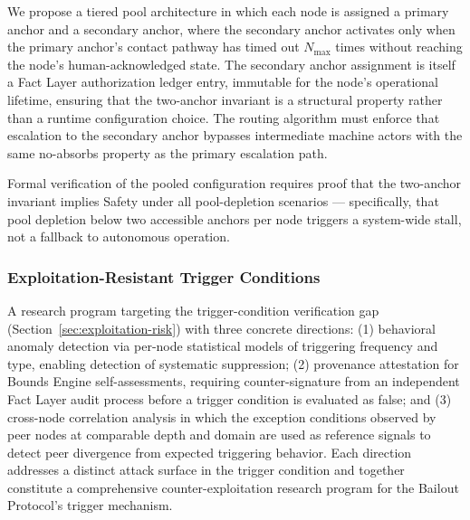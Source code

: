 We propose a tiered pool architecture in which each node is assigned a primary
anchor and a secondary anchor, where the secondary anchor activates only when
the primary anchor's contact pathway has timed out $N_{\max}$ times without
reaching the node's human-acknowledged state.  The secondary anchor assignment
is itself a Fact Layer authorization ledger entry, immutable for the node's
operational lifetime, ensuring that the two-anchor invariant is a structural
property rather than a runtime configuration choice.  The routing algorithm
must enforce that escalation to the secondary anchor bypasses intermediate
machine actors with the same no-absorbs property as the primary escalation path.

Formal verification of the pooled configuration requires proof that the
two-anchor invariant implies Safety under all pool-depletion scenarios ---
specifically, that pool depletion below two accessible anchors per node triggers
a system-wide stall, not a fallback to autonomous operation.

\subsubsection{Exploitation-Resistant Trigger Conditions}\label{sec:exploitation-resistant-triggers}

A research program targeting the trigger-condition verification gap
(Section~\ref{sec:exploitation-risk}) with three concrete directions:
(1) behavioral anomaly detection via per-node statistical models of
triggering frequency and type, enabling detection of systematic suppression;
(2) provenance attestation for Bounds Engine self-assessments, requiring
counter-signature from an independent Fact Layer audit process before a
trigger condition is evaluated as false; and (3) cross-node correlation
analysis in which the exception conditions observed by peer nodes at comparable
depth and domain are used as reference signals to detect peer divergence from
expected triggering behavior.  Each direction addresses a distinct attack
surface in the trigger condition and together constitute a comprehensive
counter-exploitation research program for the Bailout Protocol's trigger
mechanism.
